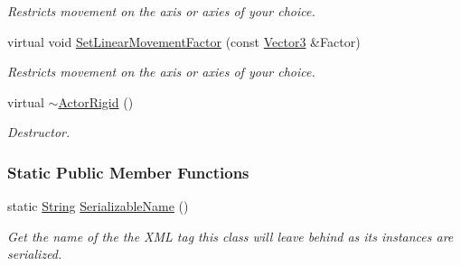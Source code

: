 \begin{DoxyCompactItemize}
\begin{DoxyCompactList}\small\item\em Restricts movement on the axis or axies of your choice. \item\end{DoxyCompactList}\item 
virtual void \hyperlink{classphys_1_1ActorRigid_a2a6aca8c598716ee24558878f869f163}{SetLinearMovementFactor} (const \hyperlink{classphys_1_1Vector3}{Vector3} \&Factor)
\begin{DoxyCompactList}\small\item\em Restricts movement on the axis or axies of your choice. \item\end{DoxyCompactList}\item 
virtual \hyperlink{classphys_1_1ActorRigid_ab317b5a2578157e54655a1aea8f4d058}{$\sim$ActorRigid} ()
\begin{DoxyCompactList}\small\item\em Destructor. \item\end{DoxyCompactList}\end{DoxyCompactItemize}
\subsubsection*{Static Public Member Functions}
\begin{DoxyCompactItemize}
\item 
static \hyperlink{namespacephys_aa03900411993de7fbfec4789bc1d392e}{String} \hyperlink{classphys_1_1ActorRigid_ad4fcecfacedb0c043b768555046dc650}{SerializableName} ()
\begin{DoxyCompactList}\small\item\em Get the name of the the XML tag this class will leave behind as its instances are serialized. \item\end{DoxyCompactList}\end{DoxyCompactItemize}
